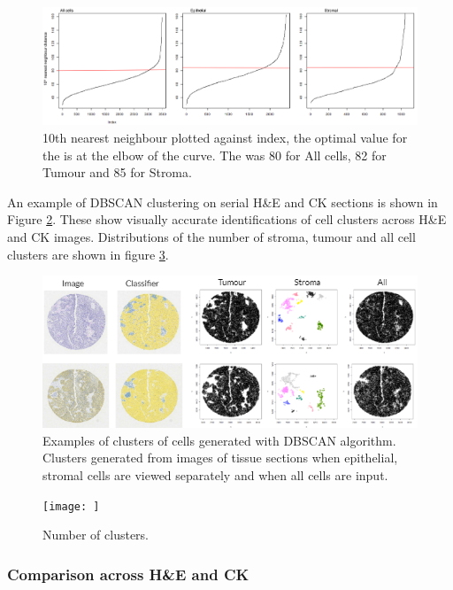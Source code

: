 \begin{figure}
    \centering
    \includegraphics[width=\textwidth]{Chapter3/Figs/Thesis-11.png}
    \caption{10th nearest neighbour plotted against index, the optimal value for the  is at the elbow of the curve. The  was 80 for All cells, 82 for Tumour and 85 for Stroma.}
    \label{fig:eps}
\end{figure}

An example of DBSCAN clustering on serial H\&E and CK sections is shown in Figure \ref{fig:dbclust}. These show visually accurate identifications of cell clusters across H\&E and CK images. Distributions of the number of stroma, tumour and all cell clusters are shown in figure \ref{fig:dbscatter}.

\begin{figure}
    \centering
    \includegraphics[width=\textwidth]{Chapter3/Figs/dbscan_fullexample.png}
    \caption[DBSCAN example]{Examples of clusters of cells generated with DBSCAN algorithm. Clusters generated from images of tissue sections when epithelial, stromal cells are viewed separately and when all cells are input.}
    \label{fig:dbclust}
\end{figure}

\begin{figure}
    \centering
    \texttt{[image: ]}
    \caption{Number of clusters.}
    \label{fig:dbscatter}
\end{figure}

\subsubsection{Comparison across H\&E and CK}

